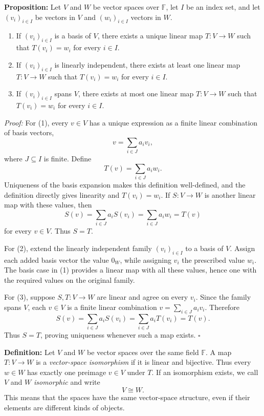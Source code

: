\documentclass[a4paper,11pt,abstract=true]{scrartcl}
\theoremstyle{dotlessP}
\theoremstyle{dotlessS}
\theoremstyle{remark}
\theoremstyle{definition}
\begin{document}
\begin{problem_box}
\textbf{Proposition:} Let $V$ and
$W$ be vector spaces over $\mathbb{F}$, let $I$ be an index set, and let
$(v_i)_{i\in I}$ be vectors in $V$ and $(w_i)_{i\in I}$ vectors in $W$.
\begin{enumerate}
    \item If $(v_i)_{i\in I}$ is a basis of $V$, there exists a unique
    linear map $T:V\longrightarrow W$ such that $T(v_i)=w_i$ for every
    $i\in I$.
    \item If $(v_i)_{i\in I}$ is linearly independent, there exists at
    least one linear map $T:V\longrightarrow W$ such that
    $T(v_i)=w_i$ for every $i\in I$.
    \item If $(v_i)_{i\in I}$ spans $V$, there exists at most one linear
    map $T:V\longrightarrow W$ such that $T(v_i)=w_i$ for every $i\in I$.
\end{enumerate}
\end{problem_box}

\begin{claim_box}
\textit{Proof:} For (1), every $v\in V$ has a unique expression as a
finite linear combination of basis vectors,
\[
v=\sum_{i\in J}a_i v_i,
\]
where $J\subseteq I$ is finite. Define
\[
T(v)=\sum_{i\in J}a_i w_i.
\]
Uniqueness of the basis expansion makes this definition well-defined,
and the definition directly gives linearity and $T(v_i)=w_i$. If
$S:V\longrightarrow W$ is another linear map with these values, then
\[
S(v)=\sum_{i\in J}a_i S(v_i)
=\sum_{i\in J}a_i w_i=T(v)
\]
for every $v\in V$. Thus $S=T$.

For (2), extend the linearly independent family $(v_i)_{i\in I}$ to a
basis of $V$. Assign each added basis vector the value $0_W$, while
assigning $v_i$ the prescribed value $w_i$. The basis case in (1)
provides a linear map with all these values, hence one with the required
values on the original family.

For (3), suppose $S,T:V\longrightarrow W$ are linear and agree on every
$v_i$. Since the family spans $V$, each $v\in V$ is a finite linear
combination $v=\sum_{i\in J}a_i v_i$. Therefore
\[
S(v)=\sum_{i\in J}a_i S(v_i)
=\sum_{i\in J}a_i T(v_i)=T(v).
\]
Thus $S=T$, proving uniqueness whenever such a map exists.
\hfill$\square$
\end{claim_box}

\begin{definition_box}
\textbf{Definition:} Let $V$ and $W$ be vector spaces
over the same field $\mathbb{F}$. A map $T:V\longrightarrow W$ is a
\emph{vector-space isomorphism} if it is linear and bijective. Thus every
$w\in W$ has exactly one preimage $v\in V$ under $T$.
If an isomorphism exists, we call $V$ and $W$ \emph{isomorphic} and write
\[
V\cong W.
\]
This means that the spaces have the same vector-space structure, even if
their elements are different kinds of objects.
\end{definition_box}
\end{document}
